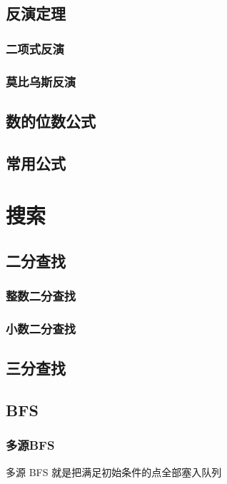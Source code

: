 \documentclass{probook}
\begin{document}
\section{反演定理} 
\subsection{二项式反演} 

\subsection{莫比乌斯反演} 

\section{数的位数公式}
 
\section{常用公式} 


\chapter{搜索}
\section{二分查找}
\subsection{整数二分查找}
 
\subsection{小数二分查找}
 
\section{三分查找}
 
\section{BFS}
\subsection{多源BFS}
多源 BFS 就是把满足初始条件的点全部塞入队列
 
\end{document}
